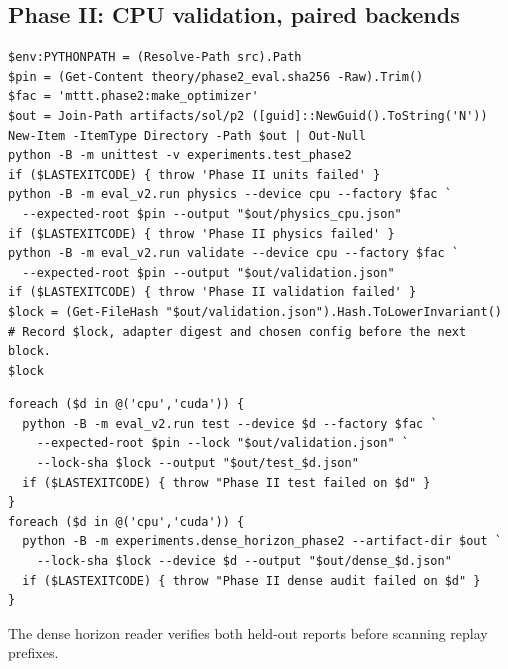 \subsection{Phase II: CPU validation, paired backends}
\begin{commandblock}
\begin{verbatim}
$env:PYTHONPATH = (Resolve-Path src).Path
$pin = (Get-Content theory/phase2_eval.sha256 -Raw).Trim()
$fac = 'mttt.phase2:make_optimizer'
$out = Join-Path artifacts/sol/p2 ([guid]::NewGuid().ToString('N'))
New-Item -ItemType Directory -Path $out | Out-Null
python -B -m unittest -v experiments.test_phase2
if ($LASTEXITCODE) { throw 'Phase II units failed' }
python -B -m eval_v2.run physics --device cpu --factory $fac `
  --expected-root $pin --output "$out/physics_cpu.json"
if ($LASTEXITCODE) { throw 'Phase II physics failed' }
python -B -m eval_v2.run validate --device cpu --factory $fac `
  --expected-root $pin --output "$out/validation.json"
if ($LASTEXITCODE) { throw 'Phase II validation failed' }
$lock = (Get-FileHash "$out/validation.json").Hash.ToLowerInvariant()
# Record $lock, adapter digest and chosen config before the next block.
$lock
\end{verbatim}
\end{commandblock}
\begin{commandblock}
\begin{verbatim}
foreach ($d in @('cpu','cuda')) {
  python -B -m eval_v2.run test --device $d --factory $fac `
    --expected-root $pin --lock "$out/validation.json" `
    --lock-sha $lock --output "$out/test_$d.json"
  if ($LASTEXITCODE) { throw "Phase II test failed on $d" }
}
foreach ($d in @('cpu','cuda')) {
  python -B -m experiments.dense_horizon_phase2 --artifact-dir $out `
    --lock-sha $lock --device $d --output "$out/dense_$d.json"
  if ($LASTEXITCODE) { throw "Phase II dense audit failed on $d" }
}
\end{verbatim}
\end{commandblock}
The dense horizon reader verifies both held-out reports before scanning replay prefixes.

